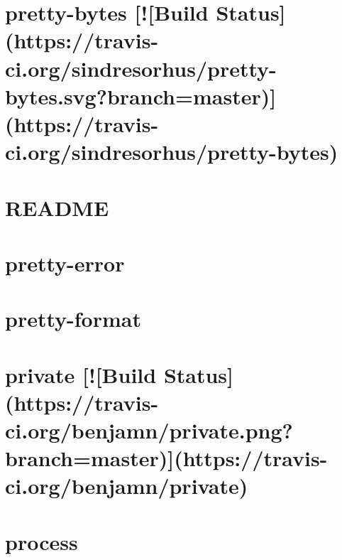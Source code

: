 \documentclass[twoside]{book}
\newcommand{\+}{\discretionary{\mbox{\scriptsize$\hookleftarrow$}}{}{}}
\begin{document}
\chapter{pretty-\/bytes \mbox{[}!\mbox{[}Build Status\mbox{]}(https\+://travis-\/ci.org/sindresorhus/pretty-\/bytes.svg?branch=master)\mbox{]}(https\+://travis-\/ci.org/sindresorhus/pretty-\/bytes)}
\label{md__c_1_workspace_demo_src_main_script_node_modules_pretty-bytes_readme}

\chapter{R\+E\+A\+D\+ME}
\label{md__c_1_workspace_demo_src_main_script_node_modules_pretty-error_node_modules_utila__r_e_a_d_m_e}

\chapter{pretty-\/error}
\label{md__c_1_workspace_demo_src_main_script_node_modules_pretty-error__r_e_a_d_m_e}

\chapter{pretty-\/format}
\label{md__c_1_workspace_demo_src_main_script_node_modules_pretty-format__r_e_a_d_m_e}

\chapter{private \mbox{[}!\mbox{[}Build Status\mbox{]}(https\+://travis-\/ci.org/benjamn/private.png?branch=master)\mbox{]}(https\+://travis-\/ci.org/benjamn/private)}
\label{md__c_1_workspace_demo_src_main_script_node_modules_private__r_e_a_d_m_e}

\chapter{process}
\label{md__c_1_workspace_demo_src_main_script_node_modules_process__r_e_a_d_m_e}

\end{document}
